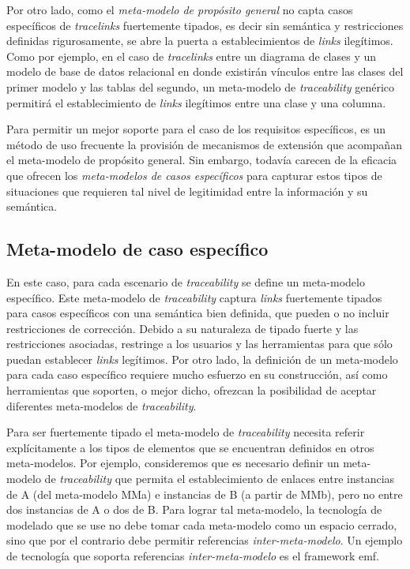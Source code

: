 \documentclass[a4paper,12pt,oneside,spanish]{book}
\begin{document}
Por otro lado, como el \textit{meta-modelo de propósito general} no capta casos específicos de \textit{tracelinks} fuertemente tipados, es decir sin semántica y restricciones definidas rigurosamente, se abre la puerta a establecimientos de \textit{links} ilegítimos. Como por ejemplo, en el caso de \textit{tracelinks} entre un diagrama de clases y un modelo de base de datos relacional en donde existirán vínculos entre las clases del primer modelo y las tablas del segundo, un meta-modelo de \textit{traceability} genérico permitirá el establecimiento de \textit{links} ilegítimos entre una clase y una columna.

Para permitir un mejor soporte para el caso de los requisitos específicos, es un método de uso frecuente la provisión de mecanismos de extensión que acompañan el meta-modelo de propósito general. Sin embargo, todavía carecen de la eficacia que ofrecen los \textit{meta-modelos de casos específicos} para capturar estos tipos de situaciones que requieren tal nivel de legitimidad entre la información y su semántica.

\subsection{Meta-modelo de caso específico}

En este caso, para cada escenario de \textit{traceability} se define un meta-modelo específico. Este meta-modelo de \textit{traceability} captura \textit{links} fuertemente tipados para casos específicos con una semántica bien definida, que pueden o no incluir restricciones de corrección. Debido a su naturaleza de tipado fuerte y las restricciones asociadas, restringe a los usuarios y las herramientas para que sólo puedan establecer \textit{links} legítimos. Por otro lado, la definición de un meta-modelo para cada caso específico requiere mucho esfuerzo en su construcción, así como herramientas que soporten, o mejor dicho, ofrezcan la posibilidad de aceptar diferentes meta-modelos de \textit{traceability}.

Para ser fuertemente tipado el meta-modelo de \textit{traceability} necesita referir explícitamente a los tipos de elementos que se encuentran definidos en otros meta-modelos. Por ejemplo, consideremos que es necesario definir un meta-modelo de \textit{traceability} que permita el establecimiento de enlaces entre instancias de A (del meta-modelo MMa) e instancias de B (a partir de MMb), pero no entre dos instancias de A o dos de B. Para lograr tal meta-modelo, la tecnología de modelado que se use no debe tomar cada meta-modelo como un espacio cerrado, sino que por el contrario debe permitir referencias \textit{inter-meta-modelo}. Un ejemplo de tecnología que soporta referencias \textit{inter-meta-modelo} es el framework \gls{emf}.
\end{document}
